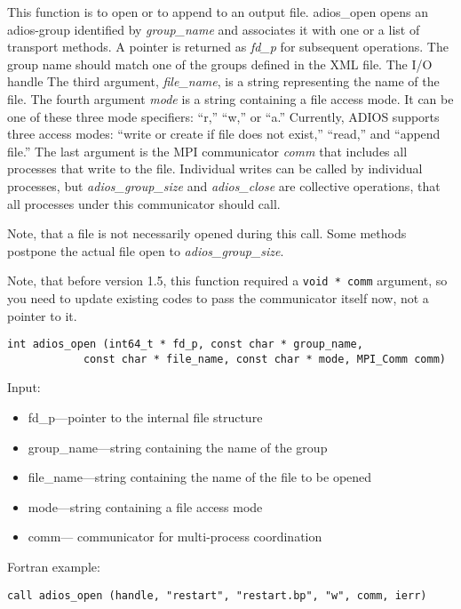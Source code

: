This function is to open or to append to an output file. adios\_open
opens an adios-group identified by \textit{group\_name}
and associates it with one or a list of transport methods. 
A pointer is returned as \textit{fd\_p} for subsequent operations. 
The group name should match one of the groups defined in the XML file. The I/O handle 
The third argument, \textit{file\_name}, is a string representing the name of 
the file. 
The fourth argument \textit{mode} is a string containing a file access mode. 
It can be one of these three mode specifiers: ``r,'' ``w,'' or ``a.'' Currently, 
ADIOS supports three access modes: ``write or create if file does not exist,'' 
``read,'' and ``append file.'' 
The last argument is the MPI communicator \textit{comm} that includes all
processes that write to the file. Individual writes can be called by individual processes, but \textit{adios\_group\_size} and \textit{adios\_close} are collective operations, that all processes under this communicator should call. 

Note, that a file is not necessarily opened during this call. Some methods postpone the actual file open to \textit{adios\_group\_size}.

Note, that before version 1.5, this function required a \verb+void * comm+ argument, so you need to update existing codes to pass the communicator itself now, not a pointer to it.

\begin{lstlisting}[alsolanguage=C]
int adios_open (int64_t * fd_p, const char * group_name,
            const char * file_name, const char * mode, MPI_Comm comm)
\end{lstlisting}

Input: 
\begin{itemize}
\item fd\_p---pointer to the internal file structure
\item group\_name---string containing the name of the group 
\item file\_name---string containing the name of the file to be opened 
\item mode---string containing  a file access mode
\item comm--- communicator for multi-process coordination
\end{itemize}

Fortran example: 
\begin{lstlisting}[alsolanguage=Fortran]
call adios_open (handle, "restart", "restart.bp", "w", comm, ierr)
\end{lstlisting}

